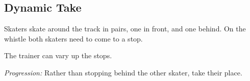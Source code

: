 \subsection*{Dynamic Take}
\label{drill:stopping/dynamic_take}

Skaters skate around the track in pairs, one in front, and one behind.
On the whistle both skaters need to come to a stop.

The trainer can vary up the stops.

{\it Progression: }
Rather than stopping behind the other skater, take their place.
